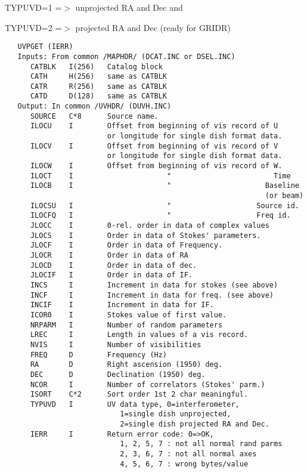 TYPUVD=1 =$>$ unprojected RA and Dec and

TYPUVD=2 =$>$ projected RA and Dec (ready for GRIDR)
\begin{verbatim}
   UVPGET (IERR)
   Inputs: From common /MAPHDR/ (DCAT.INC or DSEL.INC)
      CATBLK   I(256)   Catalog block
      CATH     H(256)   same as CATBLK
      CATR     R(256)   same as CATBLK
      CATD     D(128)   same as CATBLK
   Output: In common /UVHDR/ (DUVH.INC)
      SOURCE   C*8      Source name.
      ILOCU    I        Offset from beginning of vis record of U
                        or longitude for single dish format data.
      ILOCV    I        Offset from beginning of vis record of V
                        or longitude for single dish format data.
      ILOCW    I        Offset from beginning of vis record of W.
      ILOCT    I                      "                        Time
      ILOCB    I                      "                      Baseline
                                                             (or beam)
      ILOCSU   I                      "                    Source id.
      ILOCFQ   I                      "                    Freq id.
      JLOCC    I        0-rel. order in data of complex values
      JLOCS    I        Order in data of Stokes' parameters.
      JLOCF    I        Order in data of Frequency.
      JLOCR    I        Order in data of RA
      JLOCD    I        Order in data of dec.
      JLOCIF   I        Order in data of IF.
      INCS     I        Increment in data for stokes (see above)
      INCF     I        Increment in data for freq. (see above)
      INCIF    I        Increment in data for IF.
      ICOR0    I        Stokes value of first value.
      NRPARM   I        Number of random parameters
      LREC     I        Length in values of a vis record.
      NVIS     I        Number of visibilities
      FREQ     D        Frequency (Hz)
      RA       D        Right ascension (1950) deg.
      DEC      D        Declination (1950) deg.
      NCOR     I        Number of correlators (Stokes' parm.)
      ISORT    C*2      Sort order 1st 2 char meaningful.
      TYPUVD   I        UV data type, 0=interferometer,
                           1=single dish unprojected,
                           2=single dish projected RA and Dec.
      IERR     I        Return error code: 0=>OK,
                           1, 2, 5, 7 : not all normal rand parms
                           2, 3, 6, 7 : not all normal axes
                           4, 5, 6, 7 : wrong bytes/value
\end{verbatim}

